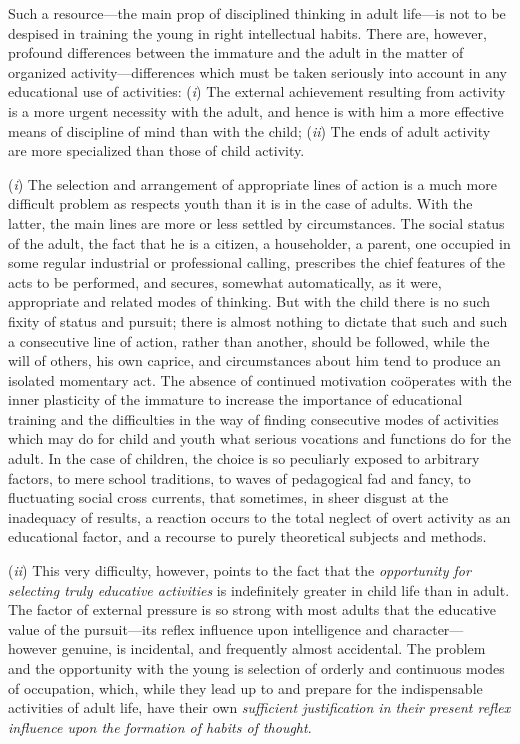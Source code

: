 \documentclass[letterpaper]{book}
\begin{document}
Such a resource---the main prop of disciplined thinking in adult
life---is not to be despised in training the young in right intellectual
habits. There are, however, profound differences between the immature
and
the
adult in the matter of organized activity---differences which must be
taken seriously into account in any educational use of activities:
(\emph{i}) The external achievement resulting from activity is a more
urgent necessity with the adult, and hence is with him a more effective
means of discipline of mind than with the child; (\emph{ii}) The ends of
adult activity are more specialized than those of child activity.


(\emph{i}) The selection and arrangement of appropriate lines of action
is a much more difficult problem as respects youth than it is in the
case of adults. With the latter, the main lines are more or less settled
by circumstances. The social status of the adult, the fact that he is a
citizen, a householder, a parent, one occupied in some regular
industrial or professional calling, prescribes the chief features of the
acts to be performed, and secures, somewhat automatically, as it were,
appropriate and related modes of thinking. But with the child there is
no such fixity of status and pursuit; there is almost nothing to dictate
that such and such a consecutive line of action, rather than another,
should be followed, while the will of others, his own caprice, and
circumstances about him tend to produce an isolated momentary act. The
absence of continued motivation coöperates with the inner plasticity of
the immature to increase the importance of educational training and the
difficulties in the way of finding consecutive modes of activities which
may do for child and youth what serious vocations and functions do for
the adult. In the case of children, the choice is so peculiarly exposed
to arbitrary factors, to mere school traditions, to waves of pedagogical
fad and fancy, to fluctuating social cross currents, that sometimes, in
sheer disgust at the inadequacy of results, a reaction
occurs
to the total neglect of overt activity as an educational factor, and a
recourse to purely theoretical subjects and methods.


(\emph{ii}) This very difficulty, however, points to the fact that the
\emph{opportunity for selecting truly educative activities} is
indefinitely greater in child life than in adult. The factor of external
pressure is so strong with most adults that the educative value of the
pursuit---its reflex influence upon intelligence and character---however
genuine, is incidental, and frequently almost accidental. The problem
and the opportunity with the young is selection of orderly and
continuous modes of occupation, which, while they lead up to and prepare
for the indispensable activities of adult life, have their own
\emph{sufficient justification in their present reflex influence upon
the formation of habits of thought}.
\end{document}
